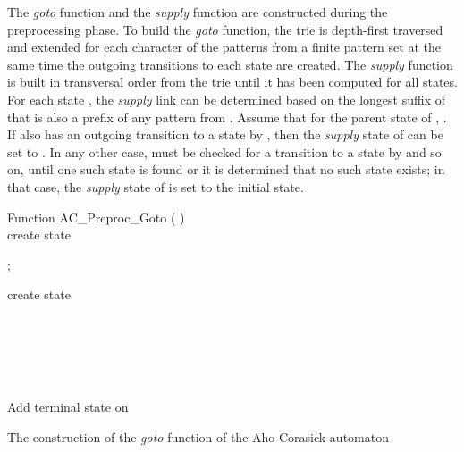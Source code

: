 \documentclass{ws-ijait}
\begin{document}
The \textit{goto} function and the \textit{supply} function are constructed during the preprocessing phase. To build the \textit{goto} function, the trie is depth-first traversed and extended for each character of the patterns from a finite pattern set  at the same time the outgoing transitions to each state are created. The \textit{supply} function is built in transversal order from the trie until it has been computed for all states. For each state , the \textit{supply} link can be determined based on the longest suffix of  that is also a prefix of any pattern from . Assume that for the parent state  of , . If  also has an outgoing transition to a state  by , then the \textit{supply} state of  can be set to . In any other case,  must be checked for a transition to a state by  and so on, until one such state is found or it is determined that no such state exists; in that case, the \textit{supply} state of  is set to the initial state.

\begin{algorithm}[H]

Function AC\_Preproc\_Goto (  )\\

create state 

\ForAll{  } {

	
}

\For{  } {

	; \\
	
	\While{  }{
	
		; \\
	}
	
	\For{ } {
		
		create state \\
		
		\ForAll{  } {

			

		}
		
		\\
	
		\\
	
		\\
	}
	
	\\
	Add terminal state on \\
}

\caption{The construction of the \textit{goto} function  of the Aho-Corasick automaton}
\label{compl:aho_corasick_preprocessing_goto}
\end{algorithm}
\end{document}
